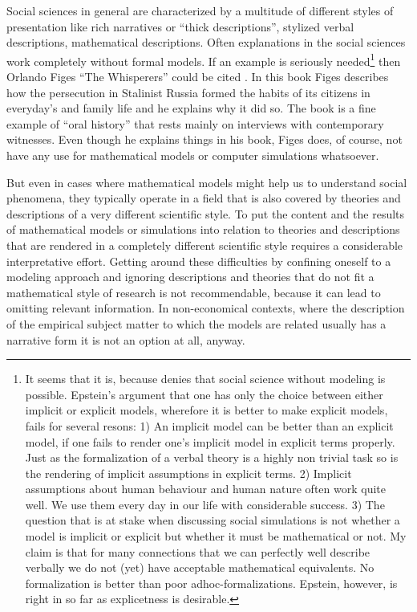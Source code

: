 \documentclass[onecollarge]{STJour}
\numberwithin{equation}{section}
\begin{document}
Social sciences in general are characterized by a multitude of different
styles of presentation like rich narratives or ``thick descriptions'',
stylized verbal descriptions, mathematical descriptions. Often
explanations in the social sciences work completely without formal
models. If an example is seriously needed\footnote{It seems that it is,
because \citet{epstein:2008} denies that social science without modeling
is possible. Epstein's argument that one has only the choice between
either implicit or explicit models, wherefore it is better to make
explicit models, fails for several resons: 1) An implicit model can be
better than an explicit model, if one fails to render one's implicit
model in explicit terms properly. Just as the formalization of a verbal
theory is a highly non trivial task so is the rendering of implicit
assumptions in explicit terms. 2) Implicit assumptions about human
behaviour and human nature often work quite well. We use them every day
in our life with considerable success. 3) The question that is at stake
when discussing social simulations is not whether a model is implicit or
explicit but whether it must be mathematical or not. My claim is that for
many connections that we can perfectly well describe verbally we do not
(yet) have acceptable mathematical equivalents. No formalization is
better than poor adhoc-formalizations. Epstein, however, is right in so
far as explicetness is desirable.} then Orlando Figes\label{figes} ``The
Whisperers'' could be cited \citep{figes:2008}. In this book Figes
describes how the persecution in Stalinist Russia formed the habits of
its citizens in everyday's and family life and he explains why it did so.
The book is a fine example of ``oral history'' that rests mainly on
interviews with contemporary witnesses. Even though he explains things in
his book, Figes does, of course, not have any use for mathematical models
or computer simulations whatsoever.

But even in cases where mathematical models might help us to understand
social phenomena, they typically operate in a field that is also covered
by theories and descriptions of a very different scientific style. To put
the content and the results of mathematical models or simulations into
relation to theories and descriptions that are rendered in a completely
different scientific style requires a considerable interpretative effort.
Getting around these difficulties by confining oneself to a modeling
approach and ignoring descriptions and theories that do not fit a
mathematical style of research is not recommendable, because it can lead
to omitting relevant information. In non-economical contexts, where the
description of the empirical subject matter to which the models are
related usually has a narrative form it is not an option at all, anyway.
\end{document}
